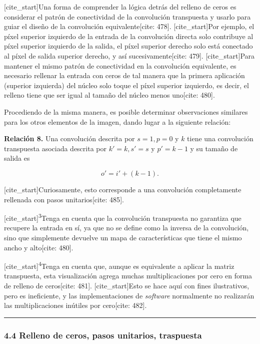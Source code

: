\documentclass[
  super,
  preprint,
  3p]{elsarticle}
\begin{document}
{[}cite\_start{]}Una forma de comprender la lógica detrás del relleno de
ceros es considerar el patrón de conectividad de la convolución
transpuesta y usarlo para guiar el diseño de la convolución
equivalente{[}cite: 478{]}. {[}cite\_start{]}Por ejemplo, el píxel
superior izquierdo de la entrada de la convolución directa solo
contribuye al píxel superior izquierdo de la salida, el píxel superior
derecho solo está conectado al píxel de salida superior derecho, y así
sucesivamente{[}cite: 479{]}. {[}cite\_start{]}Para mantener el mismo
patrón de conectividad en la convolución equivalente, es necesario
rellenar la entrada con ceros de tal manera que la primera aplicación
(superior izquierda) del núcleo solo toque el píxel superior izquierdo,
es decir, el relleno tiene que ser igual al tamaño del núcleo menos
uno{[}cite: 480{]}.

Procediendo de la misma manera, es posible determinar observaciones
similares para los otros elementos de la imagen, dando lugar a la
siguiente relación:

\textbf{Relación 8.} Una convolución descrita por \(s = 1, p = 0\) y
\(k\) tiene una convolución transpuesta asociada descrita por
\(k' = k, s' = s\) y \(p' = k - 1\) y su tamaño de salida es

\[o' = i' + (k - 1).\]

{[}cite\_start{]}Curiosamente, esto corresponde a una convolución
completamente rellenada con pasos unitarios{[}cite: 485{]}.

{[}cite\_start{]}\textsuperscript{3}Tenga en cuenta que la convolución
transpuesta no garantiza que recupere la entrada en sí, ya que no se
define como la inversa de la convolución, sino que simplemente devuelve
un mapa de características que tiene el mismo ancho y alto{[}cite:
480{]}.

{[}cite\_start{]}\textsuperscript{4}Tenga en cuenta que, aunque es
equivalente a aplicar la matriz transpuesta, esta visualización agrega
muchas multiplicaciones por cero en forma de relleno de ceros{[}cite:
481{]}. {[}cite\_start{]}Esto se hace aquí con fines ilustrativos, pero
es ineficiente, y las implementaciones de \emph{software} normalmente no
realizarán las multiplicaciones inútiles por cero{[}cite: 482{]}.

\begin{center}\rule{0.5\linewidth}{0.5pt}\end{center}

\subsubsection{4.4 Relleno de ceros, pasos unitarios,
traspuesta}\label{relleno-de-ceros-pasos-unitarios-traspuesta}
\end{document}
